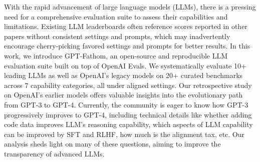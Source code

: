 With the rapid advancement of large language models (LLMs), there is a pressing need for a comprehensive evaluation suite to assess their capabilities and limitations. Existing LLM leaderboards often reference scores reported in other papers without consistent settings and prompts, which may inadvertently encourage cherry-picking favored settings and prompts for better results. In this work, we introduce GPT-Fathom, an open-source and reproducible LLM evaluation suite built on top of OpenAI Evals. We systematically evaluate 10+ leading LLMs as well as OpenAI's legacy models on 20+ curated benchmarks across 7 capability categories, all under aligned settings. Our retrospective study on OpenAI's earlier models offers valuable insights into the evolutionary path from GPT-3 to GPT-4. Currently, the community is eager to know how GPT-3 progressively improves to GPT-4, including technical details like whether adding code data improves LLM's reasoning capability, which aspects of LLM capability can be improved by SFT and RLHF, how much is the alignment tax, etc. Our analysis sheds light on many of these questions, aiming to improve the transparency of advanced LLMs.
